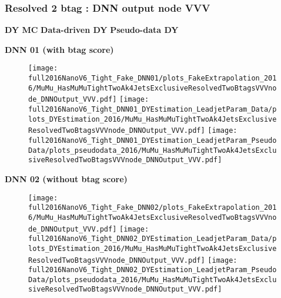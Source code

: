\documentclass[9pt]{beamer}
\begin{document}
\begin{frame}
	\frametitle{Resolved 2 btag : DNN output node VVV}
    \hspace{2cm} \textbf{DY MC} \hspace{1.9cm} \textbf{Data-driven DY} \hspace{1cm} \textbf{Pseudo-data DY}
    \begin{center}
        \textbf{DNN 01 (with btag score)}
    \end{center}
	\begin{figure}
		\texttt{[image: full2016NanoV6\_Tight\_Fake\_DNN01/plots\_FakeExtrapolation\_2016/MuMu\_HasMuMuTightTwoAk4JetsExclusiveResolvedTwoBtagsVVVnode\_DNNOutput\_VVV.pdf]}
		\texttt{[image: full2016NanoV6\_Tight\_DNN01\_DYEstimation\_LeadjetParam\_Data/plots\_DYEstimation\_2016/MuMu\_HasMuMuTightTwoAk4JetsExclusiveResolvedTwoBtagsVVVnode\_DNNOutput\_VVV.pdf]}
		\texttt{[image: full2016NanoV6\_Tight\_DNN01\_DYEstimation\_LeadjetParam\_PseudoData/plots\_pseudodata\_2016/MuMu\_HasMuMuTightTwoAk4JetsExclusiveResolvedTwoBtagsVVVnode\_DNNOutput\_VVV.pdf]}
	\end{figure}
    \begin{center}
        \textbf{DNN 02 (without btag score)}
    \end{center}
	\begin{figure}
		\texttt{[image: full2016NanoV6\_Tight\_Fake\_DNN02/plots\_FakeExtrapolation\_2016/MuMu\_HasMuMuTightTwoAk4JetsExclusiveResolvedTwoBtagsVVVnode\_DNNOutput\_VVV.pdf]}
		\texttt{[image: full2016NanoV6\_Tight\_DNN02\_DYEstimation\_LeadjetParam\_Data/plots\_DYEstimation\_2016/MuMu\_HasMuMuTightTwoAk4JetsExclusiveResolvedTwoBtagsVVVnode\_DNNOutput\_VVV.pdf]}
		\texttt{[image: full2016NanoV6\_Tight\_DNN02\_DYEstimation\_LeadjetParam\_PseudoData/plots\_pseudodata\_2016/MuMu\_HasMuMuTightTwoAk4JetsExclusiveResolvedTwoBtagsVVVnode\_DNNOutput\_VVV.pdf]}
	\end{figure}
\end{frame}
\end{document}
